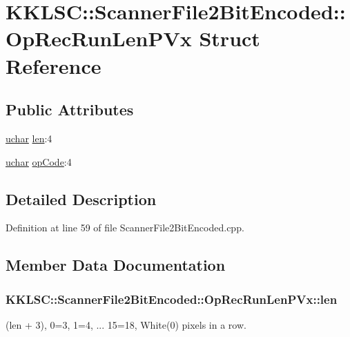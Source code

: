 \hypertarget{struct_scanner_file2_bit_encoded_1_1_op_rec_run_len_p_vx}{}\section{K\+K\+L\+SC\+:\+:Scanner\+File2\+Bit\+Encoded\+:\+:Op\+Rec\+Run\+Len\+P\+Vx Struct Reference}
\label{struct_scanner_file2_bit_encoded_1_1_op_rec_run_len_p_vx}
\subsection*{Public Attributes}
\begin{DoxyCompactItemize}
\item 
\hyperlink{namespace_k_k_b_ace9969169bf514f9ee6185186949cdf7}{uchar} \hyperlink{struct_scanner_file2_bit_encoded_1_1_op_rec_run_len_p_vx_a86630e13cad90e0a474fbf247d7c853a}{len}\+:4
\item 
\hyperlink{namespace_k_k_b_ace9969169bf514f9ee6185186949cdf7}{uchar} \hyperlink{struct_scanner_file2_bit_encoded_1_1_op_rec_run_len_p_vx_a3001c9a5c5ad13604cc200d34eb11625}{op\+Code}\+:4
\end{DoxyCompactItemize}


\subsection{Detailed Description}


Definition at line 59 of file Scanner\+File2\+Bit\+Encoded.\+cpp.



\subsection{Member Data Documentation}
\subsubsection[{\texorpdfstring{len}{len}}]{ K\+K\+L\+S\+C\+::\+Scanner\+File2\+Bit\+Encoded\+::\+Op\+Rec\+Run\+Len\+P\+Vx\+::len}\hypertarget{struct_scanner_file2_bit_encoded_1_1_op_rec_run_len_p_vx_a86630e13cad90e0a474fbf247d7c853a}{}\label{struct_scanner_file2_bit_encoded_1_1_op_rec_run_len_p_vx_a86630e13cad90e0a474fbf247d7c853a}
(len + 3), 0=3, 1=4, ... 15=18, White(0) pixels in a row. 

